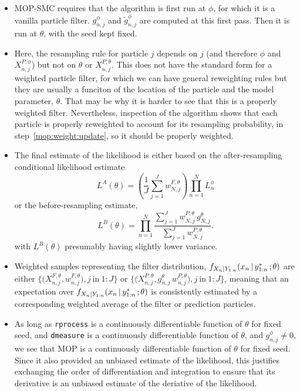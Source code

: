 \documentclass[12p]{article}
\newcommand\giventh{{\hspace{0.5mm};\hspace{0.5mm}}}
\newcommand\seq[2]{{#1}\!:\!{#2}}
\newcommand\given{{\,\vert\,}}
\begin{document}
\begin{itemize}
\item MOP-SMC requires that the algorithm is first run at $\phi$, for which it is a vanilla particle filter.  $g^{\phi}_{n,j}$ and $\tilde g^{\phi}_{n,j}$ are computed at this first pass. Then it is run at $\theta$, with the seed kept fixed.

\item Here, the resampling rule for particle $j$ depends on $j$ (and therefore $\phi$ and $X^{P,\phi}_{n,j}$) but not on $\theta$ or  $X^{P,\theta}_{n,j}$. This does not have the standard form for a weighted particle filter, for which we can have general reweighting rules but they are usually a funciton of the location of the particle and the model parameter, $\theta$. That may be why it is harder to see that this is a properly weighted filter. Nevertheless, inspection of the algorithm shows that each particle is properly reweighted to account for its resampling probability, in step~\ref{mop:weight:update}, so it should be properly weighted.

\item The final estimate of the likelihood is either based on the after-resampling conditional likelihood estimate
  \begin{equation} \label{mop:likA}
    L^A(\theta) = \left(\frac{1}{J}\sum_{j=1}^J w^{F,\theta}_{N,j} \right)
    \prod_{n=1}^N L_n^\phi
  \end{equation}
  or the before-resampling estimate,
 \begin{equation}\label{mop:likB}
   L^B(\theta) = \prod_{n=1}^N \frac{\sum_{j=1}^J w^{P,\theta}_{N,j} \, g^{\theta}_{N,j}}{\sum_{j=1}^J w^{P,\theta}_{N,j}}.
  \end{equation}
 with $L^B(\theta)$ presumably having slightly lower variance.

\item Weighted samples representing the filter distribution,
  $f_{X_n|Y_{1:n}}(x_n \given y^*_{1:n} \giventh \theta)$
  are either
  $\big\{\big(X^{F,\theta}_{n,j},w^{F,\theta}_{n,j}\big),  j\ \mathrm{in}\ \seq{1}{J}\big\}$
  or
  $\big\{\big(X^{P,\theta}_{n,j}, g^\theta_{n,j} \, w^{P,\theta}_{n,j}\big),  j\ \mathrm{in}\ \seq{1}{J}\big\}$,
  meaning that an expectation over $f_{X_n|Y_{1:n}}(x_n \given y^*_{1:n} \giventh \theta)$ is consistently estimated by a corresponding weighted average of the filter or prediction particles.

  \item As long as \texttt{rprocess} is a continuously differentiable function of $\theta$ for fixed seed, and \texttt{dmeasure} is a continuously differentiable function of $\theta$, and $g^{\phi}_{n,j}\neq 0$, we see that MOP is a continuously differentiable function of $\theta$ for fixed seed. Since it also provided an unbiased estimate of the likelihood, this justifies exchanging the order of differentiation and integration to ensure that its derivative is an unbiased estimate of the deriative of the likelihood.


\end{itemize}
\end{document}
